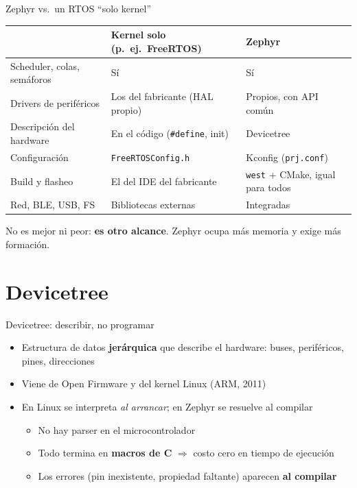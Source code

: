 \documentclass[aspectratio=169]{beamer}
\begin{document}
\begin{frame}{Zephyr vs.\ un RTOS ``solo kernel''}
\small
\centering
\begin{tabular}{p{3.6cm}p{4.6cm}p{4.6cm}}
\toprule
& \textbf{Kernel solo} (p.\ ej.\ FreeRTOS) & \textbf{Zephyr} \\
\midrule
Scheduler, colas, semáforos & Sí & Sí \\
Drivers de periféricos & Los del fabricante (HAL propio) & Propios, con \alert{API común} \\
Descripción del hardware & En el código (\texttt{\#define}, init) & \alert{Devicetree} \\
Configuración & \texttt{FreeRTOSConfig.h} & Kconfig (\texttt{prj.conf}) \\
Build y flasheo & El del IDE del fabricante & \texttt{west} + CMake, igual para todos \\
Red, BLE, USB, FS & Bibliotecas externas & Integradas \\
\bottomrule
\end{tabular}

\vspace{0.8em}
\footnotesize No es mejor ni peor: \textbf{es otro alcance}. Zephyr ocupa más memoria y exige más formación.
\end{frame}

\section{Devicetree}

\begin{frame}{Devicetree: describir, no programar}
\begin{itemize}
    \item Estructura de datos \textbf{jerárquica} que describe el hardware: buses, periféricos, pines, direcciones
    \item Viene de Open Firmware y del kernel Linux (ARM, 2011)
    \item En Linux se interpreta \emph{al arrancar}; en Zephyr se resuelve \alert{al compilar}
    \begin{itemize}
        \item No hay parser en el microcontrolador
        \item Todo termina en \textbf{macros de C} $\Rightarrow$ costo cero en tiempo de ejecución
        \item Los errores (pin inexistente, propiedad faltante) aparecen \textbf{al compilar}
    \end{itemize}
\end{itemize}
\end{frame}
\end{document}
